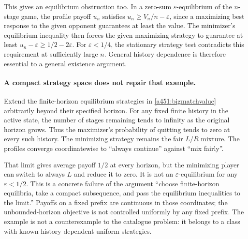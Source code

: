 \documentclass[11pt]{article}
\begin{document}
This gives an equilibrium obstruction too. In a zero-sum
$\varepsilon$-equilibrium of the $n$-stage game, the profile payoff
$u_n$ satisfies $u_n\ge V_n/n-\varepsilon$, since a maximizing best
response to the given opponent guarantees at least the value. The
minimizer's equilibrium inequality then forces the given maximizing
strategy to guarantee at least $u_n-\varepsilon\ge1/2-2\varepsilon$.
For $\varepsilon<1/4$, the stationary strategy test contradicts this
requirement at sufficiently large $n$. General history dependence is
therefore essential to a general existence argument.

\paragraph{A compact strategy space does not repair that example.}
Extend the finite-horizon equilibrium strategies in
\eqref{a451:bigmatchvalue} arbitrarily beyond their specified horizon.
For any fixed finite history in the active state, the number of stages
remaining tends to infinity as the original horizon grows. Thus the
maximizer's probability of quitting tends to zero at every such history.
The minimizing strategy remains the fair $L/R$ mixture. The profiles
converge coordinatewise to ``always continue'' against ``mix fairly''.

That limit gives average payoff $1/2$ at every horizon, but the minimizing
player can switch to always $L$ and reduce it to zero. It is not an
$\varepsilon$-equilibrium for any $\varepsilon<1/2$. This is a concrete
failure of the argument ``choose finite-horizon equilibria, take a compact
subsequence, and pass the equilibrium inequalities to the limit.''
Payoffs on a fixed prefix are continuous in those coordinates; the
unbounded-horizon objective is not controlled uniformly by any fixed
prefix. The example is not a counterexample to the catalogue problem:
it belongs to a class with known history-dependent uniform strategies.
\end{document}
